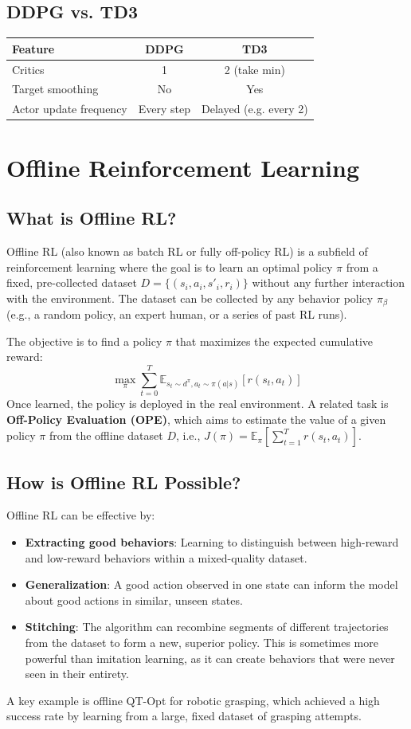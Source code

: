 \documentclass[12pt]{article}
\begin{document}
\subsection{DDPG vs. TD3}
\begin{tabular}{l|c|c}
\textbf{Feature} & \textbf{DDPG} & \textbf{TD3} \\ \hline
Critics & 1 & 2 (take min) \\
Target smoothing & No & Yes \\
Actor update frequency & Every step & Delayed (e.g. every 2) \\
\end{tabular}


\section{Offline Reinforcement Learning }

\subsection{What is Offline RL?}
Offline RL (also known as batch RL or fully off-policy RL) is a subfield of reinforcement learning where the goal is to learn an optimal policy $\pi$ from a fixed, pre-collected dataset $D = \{(s_i, a_i, s'_i, r_i)\}$ without any further interaction with the environment. The dataset can be collected by any behavior policy $\pi_\beta$ (e.g., a random policy, an expert human, or a series of past RL runs).

The objective is to find a policy $\pi$ that maximizes the expected cumulative reward:
$$ \max_\pi \sum_{t=0}^T \mathbb{E}_{s_t \sim d^\pi, a_t \sim \pi(a|s)} [r(s_t, a_t)] $$
Once learned, the policy is deployed in the real environment. A related task is \textbf{Off-Policy Evaluation (OPE)}, which aims to estimate the value of a given policy $\pi$ from the offline dataset $D$, i.e., $J(\pi) = \mathbb{E}_\pi [\sum_{t=1}^T r(s_t, a_t)]$.

\subsection{How is Offline RL Possible?}
Offline RL can be effective by:
\begin{itemize}
    \item \textbf{Extracting good behaviors}: Learning to distinguish between high-reward and low-reward behaviors within a mixed-quality dataset.
    \item \textbf{Generalization}: A good action observed in one state can inform the model about good actions in similar, unseen states.
    \item \textbf{Stitching}: The algorithm can recombine segments of different trajectories from the dataset to form a new, superior policy. This is sometimes more powerful than imitation learning, as it can create behaviors that were never seen in their entirety.
\end{itemize}
A key example is offline QT-Opt for robotic grasping, which achieved a high success rate by learning from a large, fixed dataset of grasping attempts.
\end{document}
